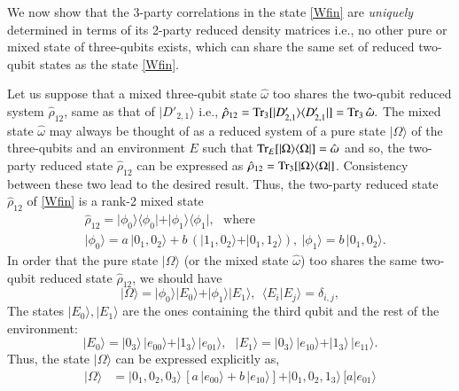 {We now show that the 3-party correlations in the state \eqref{Wfin} are  {\em uniquely} determined in terms of its 2-party reduced density matrices i.e., no other pure or mixed state of three-qubits exists, which can  share the same set of reduced two-qubit states as the state \eqref{Wfin}.

Let us suppose that a mixed  three-qubit state $\hat\omega$ too shares the  two-qubit reduced system $\hat{\rho}_{12}$, same as that of $\vert D'_{2,1}\rangle$ i.e., $\hat{\rho}_{12}={\rm Tr}_{3}[\vert D_{2,1}'\rangle\langle D_{2,1}'\vert]={\rm Tr}_{3}\,\hat{\omega}.$  The mixed state $\hat{\omega}$ may always be thought of as a reduced system of a pure state  $\vert\Omega\rangle$ of the three-qubits and an environment $E$ such that ${\rm Tr}_{E}[\vert\Omega\rangle\langle \Omega\vert]=\hat\omega$ and so, the two-party reduced state $\hat{\rho}_{12}$ can be expressed  as  $\hat{\rho}_{12}={\rm Tr}_{3}[\vert \Omega\rangle\langle \Omega\vert]$. Consistency between these two lead to the desired result. Thus, the two-party reduced  state $\hat{\rho}_{12}$ of \eqref{Wfin} is a rank-2 mixed state 
\begin{align}
&\hat{\rho}_{12}=\vert \phi_0\rangle\langle \phi_0\vert +\vert \phi_1\rangle\langle \phi_1\vert, \ \ \ \mbox{where}\label{wp2}\\ 
& \vert \phi_0\rangle= a\, \vert 0_1,0_2\rangle + b\, (\vert 1_1, 0_2\rangle +\vert 0_1,1_2\rangle),\  \vert \phi_1\rangle= b\, \vert 0_1,0_2\rangle. \nonumber
\end{align}
In order that the  pure state $\vert\Omega\rangle$ (or the mixed state $\hat\omega$) too shares the same two-qubit reduced state $\hat{\rho}_{12}$, we should have 
\begin{equation}
\vert\Omega\rangle=\vert \phi_0\rangle\vert E_0\rangle +\vert \phi_1\rangle\vert E_1\rangle, \ \  \langle E_i\vert E_j\rangle=\delta_{i,j},\label{wp3}
\end{equation}
The states $\vert E_{0}\rangle, \vert E_{1}\rangle$ are the ones containing the third qubit and the rest of the environment:    
$$
\vert E_0\rangle=\vert 0_3\rangle\,  \vert e_{00}\rangle+\vert 1_3\rangle\,  \vert e_{01}\rangle,\ \ \  \vert E_1\rangle=\vert 0_3\rangle\,  \vert e_{10}\rangle+\vert 1_3\rangle\,  \vert e_{11}\rangle. 
$$
Thus, the state $\vert \Omega\rangle$ can be expressed explicitly as,
\begin{align}
\vert \Omega\rangle&= \vert 0_1,0_2,0_3\rangle\, [a\,\vert e_{00}\rangle+b\, \vert e_{10}\rangle] + \vert 0_1,0_2,1_3\rangle\, [a\vert e_{01}\rangle\nonumber \\

\end{align}}
